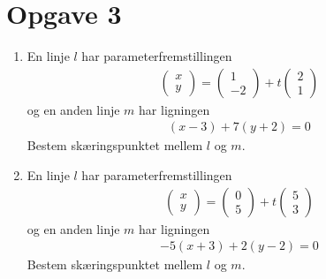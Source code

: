\section*{Opgave 3}
\begin{enumerate}[label=\roman*)]
	\item En linje $l$ har parameterfremstillingen 
	\begin{align*}
		\begin{pmatrix}
			x \\ y
		\end{pmatrix} = 
		\begin{pmatrix}
			1 \\ -2
		\end{pmatrix} + t
		\begin{pmatrix}
			2 \\ 1
		\end{pmatrix}
	\end{align*}
	og en anden linje $m$ har ligningen
	\begin{align*}
		(x-3) + 7(y+2) = 0
	\end{align*}
	Bestem skæringspunktet mellem $l$ og $m$. 
	\item En linje $l$ har parameterfremstillingen 
	\begin{align*}
		\begin{pmatrix}
			x \\ y
		\end{pmatrix} = 
		\begin{pmatrix}
			0 \\ 5
		\end{pmatrix} + t
		\begin{pmatrix}
			5 \\ 3
		\end{pmatrix}
	\end{align*}
	og en anden linje $m$ har ligningen
	\begin{align*}
		-5(x+3) + 2(y-2) = 0
	\end{align*}
	Bestem skæringspunktet mellem $l$ og $m$. 
\end{enumerate}
